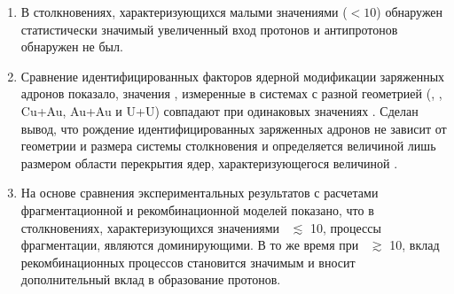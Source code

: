 \begin{enumerate}
\item В столкновениях, характеризующихся малыми значениями \Npart (\Npart$<10$) обнаружен статистически значимый увеличенный вход протонов и антипротонов обнаружен не был.

\item Сравнение идентифицированных факторов ядерной модификации заряженных адронов показало, значения \rab, измеренные в системах с разной геометрией (\dau, \heau, Cu+Au, Au+Au и U+U) совпадают при одинаковых значениях \Npart.
Сделан вывод, что рождение идентифицированных заряженных адронов не зависит от геометрии и размера системы столкновения и определяется величиной лишь размером области перекрытия ядер, характеризующегося величиной \Npart.

\item На основе сравнения экспериментальных результатов с расчетами фрагментационной и рекомбинационной моделей показано, что в столкновениях, характеризующихся значениями \Npart \ $\lesssim$ 10, процессы фрагментации, являются доминирующими. В то же время при \Npart \ $\gtrsim$ 10, вклад рекомбинационных процессов становится значимым и вносит дополнительный вклад в образование протонов. 

\end{enumerate}

